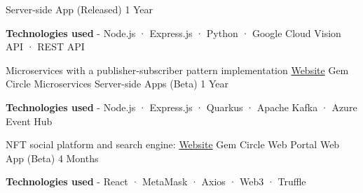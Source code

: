 \begin{cventries}
    {Server-side App (Released)} %
    {1 Year} %
    {
      \begin{cvitems} %
        \item {\textbf{Technologies used} \hspace{0.03cm} - \hspace{0.03cm} Node.js \hspace{0.03cm} · \hspace{0.03cm} Express.js \hspace{0.03cm} · \hspace{0.03cm} Python \hspace{0.03cm} · \hspace{0.03cm} Google Cloud Vision API \hspace{0.03cm} · \hspace{0.03cm} REST API \\}
      \end{cvitems}
    }
  \cventry
    {Microservices with a publisher-subscriber pattern implementation \href{https://gemcircle.com/}{Website}} %
    {Gem Circle Microservices} %
    {Server-side Apps (Beta)} %
    {1 Year} %
    {
      \begin{cvitems} %
        \item {\textbf{Technologies used} \hspace{0.03cm} - \hspace{0.03cm} Node.js \hspace{0.03cm} · \hspace{0.03cm} Express.js \hspace{0.03cm} · \hspace{0.03cm} Quarkus \hspace{0.03cm} · \hspace{0.03cm} Apache Kafka \hspace{0.03cm} · \hspace{0.03cm} Azure Event Hub \\}
      \end{cvitems}
    }
  \cventry
    {NFT social platform and search engine: \href{https://gemcircle.com/}{Website}} %
    {Gem Circle Web Portal} %
    {Web App (Beta)} %
    {4 Months} %
    {
      \begin{cvitems} %
        \item {\textbf{Technologies used} \hspace{0.03cm} - \hspace{0.03cm} React \hspace{0.03cm} · \hspace{0.03cm} MetaMask \hspace{0.03cm} · \hspace{0.03cm} Axios \hspace{0.03cm} · \hspace{0.03cm} Web3 \hspace{0.03cm} · \hspace{0.03cm} Truffle \\}

\end{cvitems}}
\end{cventries}
